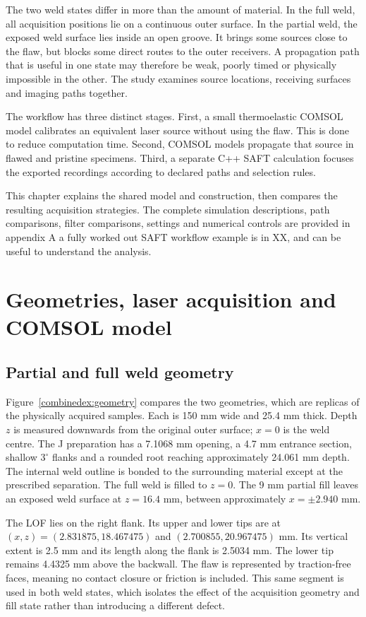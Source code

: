 The two weld states differ in more than the amount of material. In the full weld, all acquisition positions lie on a continuous outer surface. In the partial weld, the exposed weld surface lies inside an open groove. It brings some sources close to the flaw, but blocks some direct routes to the outer receivers. A propagation path that is useful in one state may therefore be weak, poorly timed or physically impossible in the other. The study examines source locations, receiving surfaces and imaging paths together.

The workflow has three distinct stages. First, a small thermoelastic COMSOL model calibrates an equivalent laser source without using the flaw. This is done to reduce computation time. Second, COMSOL models propagate that source in flawed and pristine specimens. Third, a separate C++ SAFT calculation focuses the exported recordings according to declared paths and selection rules. 

This chapter explains the shared model and construction, then compares the resulting acquisition strategies. The complete simulation descriptions, path comparisons, filter comparisons, settings and numerical controls are provided in appendix A a fully worked out SAFT workflow example is in XX, and can be useful to understand the analysis. 

\section{Geometries, laser acquisition and COMSOL model}
\label{combinedex:model}
\subsection{Partial and full weld geometry}
Figure~\ref{combinedex:geometry} compares the two geometries, which are replicas of the physically acquired samples. Each is 150 mm wide and 25.4 mm thick. Depth $z$ is measured downwards from the original outer surface; $x=0$ is the weld centre. The J preparation has a 7.1068 mm opening, a 4.7 mm entrance section, shallow $3^\circ$ flanks and a rounded root reaching approximately 24.061 mm depth. The internal weld outline is bonded to the surrounding material except at the prescribed separation. The full weld is filled to $z=0$. The 9 mm partial fill leaves an exposed weld surface at $z=16.4$ mm, between approximately $x=\pm2.940$ mm.

The LOF lies on the right flank. Its upper and lower tips are at $(x,z)=(2.831875,18.467475)$ and $(2.700855,20.967475)$ mm. Its vertical extent is 2.5 mm and its length along the flank is 2.5034 mm. The lower tip remains 4.4325 mm above the backwall. The flaw is represented by traction-free faces, meaning no contact closure or friction is included. This same segment is used in both weld states, which isolates the effect of the acquisition geometry and fill state rather than introducing a different defect.

